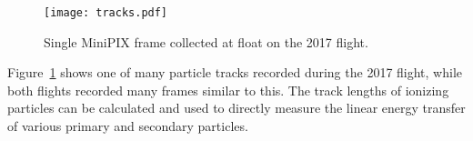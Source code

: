 %
%
%
%
\begin{figure}[H]
\centering
\texttt{[image: tracks.pdf]} %
\caption{Single MiniPIX frame collected at float on the 2017 flight.}
\label{fig:frame1}
\end{figure}
Figure~\ref{fig:frame1} shows one of many particle tracks recorded during the 2017 flight, while both flights recorded many frames similar to this.  The track lengths of ionizing particles can be calculated and used to directly measure the linear energy transfer of various primary and secondary particles.


